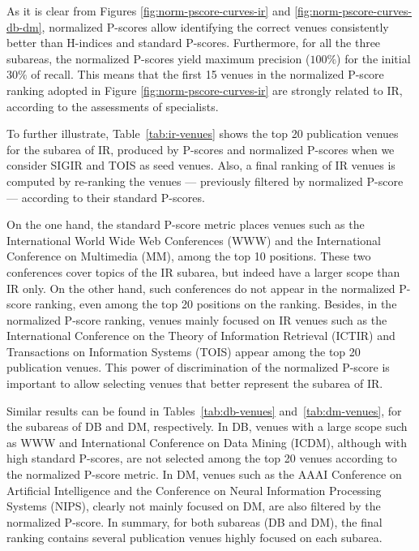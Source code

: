 \documentclass[msc]{ppgccufmg}
\begin{document}
As it is clear from Figures \ref{fig:norm-pscore-curves-ir} and \ref{fig:norm-pscore-curves-db-dm}, normalized P-scores allow identifying the correct venues consistently better than H-indices and standard P-scores. Furthermore, for all the three subareas, the normalized P-scores yield maximum precision ($100\%$) for the initial $30\%$ of recall. This means that the first 15 venues in the normalized P-score ranking adopted in Figure \ref{fig:norm-pscore-curves-ir} are strongly related to IR, according to the assessments of specialists.

To further illustrate, Table~\ref{tab:ir-venues} shows the top 20 publication venues for the subarea of IR, produced by P-scores and normalized P-scores when we consider SIGIR and TOIS as seed venues. Also, a final ranking of IR venues is computed by re-ranking the venues --- previously filtered by normalized P-score --- according to their standard P-scores.

On the one hand, the standard P-score metric places venues such as the International World Wide Web Conferences (WWW) and the International Conference on Multimedia (MM), among the top 10 positions. These two conferences cover topics of the IR subarea, but indeed have a larger scope than IR only. 
%
On the other hand, such conferences do not appear in the normalized P-score ranking, even among the top 20 positions on the ranking. Besides, in the normalized P-score ranking, venues mainly focused on IR venues such as the International Conference on the Theory of Information Retrieval (ICTIR) and Transactions on Information Systems (TOIS) appear among the top 20 publication venues. This power of discrimination of the normalized P-score is important to allow selecting venues that better represent the subarea of IR.

Similar results can be found in Tables~\ref{tab:db-venues} and~\ref{tab:dm-venues}, for the subareas of DB and DM, respectively. In DB, venues with a large scope such as WWW and International Conference on Data Mining (ICDM), although with high standard P-scores, are not selected among the top 20 venues according to the normalized P-score metric. In DM, venues such as the AAAI Conference on Artificial Intelligence and the Conference on Neural Information Processing Systems (NIPS), clearly not mainly focused on DM, are also filtered by the normalized P-score. In summary, for both subareas (DB and DM), the final ranking contains several publication venues highly focused on each subarea.

\end{document}
